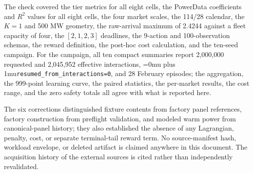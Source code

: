 ﻿\documentclass[12pt]{article}
\newcommand{\codepath}[1]{{\Urlmuskip=0mu plus 1mu\relax\nolinkurl{#1}}}
\begin{document}
The check covered the tier metrics for all eight cells, the PowerData
coefficients and \(R^2\) values for all eight cells, the four market scales, the
114/28 calendar, the \(K=1\) and 500 MW geometry, the raw-arrival maximum of
2.4244 against a fleet capacity of four, the \([2,1,2,3]\) deadlines, the
9-action and 100-observation schemas, the reward definition, the post-hoc cost
calculation, and the ten-seed campaign. For the campaign, all ten compact
summaries report 2,000,000 requested and 2,045,952 effective interactions,
\codepath{resumed_from_interactions=0}, and 28 February episodes; the
aggregation, the 999-point learning curve, the paired statistics, the per-market
results, the cost range, and the zero safety totals all agree with what is
reported here.

The six corrections distinguished fixture contents from factory panel
references, factory construction from preflight validation, and modeled warm
power from canonical-panel history; they also established the absence of any
Lagrangian, penalty, cost, or separate terminal-tail reward term. No
source-manifest hash, workload envelope, or deleted artifact is claimed
anywhere in this document. The acquisition history of the external sources is
cited rather than independently revalidated.
\end{document}
